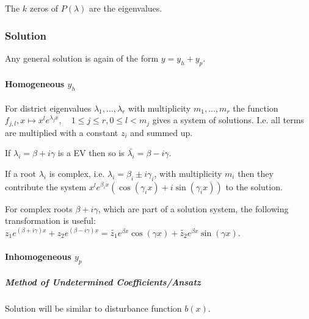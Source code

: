 The $k$ zeros of $P(\lambda)$ are the eigenvalues.

\subsubsection{Solution}
Any general solution is again of the form $y = y_h + y_p$.

\paragraph{Homogeneous $y_h$}
\begin{compactitem}
    \item For district eigenvalues $\lambda_1, \dots, \lambda_r$ with multiplicity $m_1, \dots, m_r$ the function $f_{j, l}, x \mapsto x^l e^{\lambda_j x}, \quad 1 \le j \le r, 0 \le l <m_j$ gives a system of solutions. I.e. all terms are multiplied with a constant $z_i$ and summed up.
    \item If $\lambda_i = \beta + i \gamma$ is a EV then so is $\bar{\lambda_i} = \beta - i \gamma$.
    \item If a root $\lambda_i$ is complex, i.e. $\lambda_i = \beta_i \pm i\gamma_i$, with multiplicity $m_i$ then they contribute the system $x^l e^{\beta_i x} (\cos(\gamma_ix) + i \sin(\gamma_ix))$ to the solution.
    \item For complex roots $\beta + i \gamma$, which are part of a solution system, the following transformation is useful: $z_1 e^{(\beta + i \gamma) x} + z_2 e^{(\beta - i \gamma) x} = \tilde{z_1} e^{\beta x} \cos(\gamma x) + \tilde{z_2} e^{\beta x} \sin(\gamma x)$.
\end{compactitem}

\paragraph{Inhomogeneous $y_p$}

\subparagraph{Method of Undetermined Coefficients/Ansatz}
Solution will be similar to disturbance function $b(x)$.

